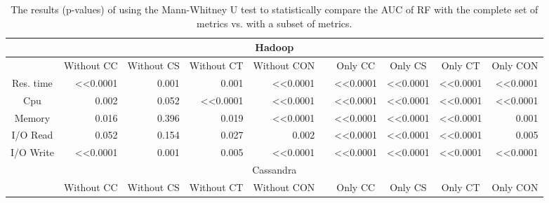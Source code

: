 \begin{table*}
\centering
\caption{The results (p-values) of using the Mann-Whitney U test to statistically compare the AUC of RF with the complete set of metrics vs. with a subset of metrics. }
    \begin{tabular}{|c|r|r|r|r|r|r|r|r|r|}
    \hline
    \multicolumn{10}{|c|}{Hadoop}   \\ \hline
              & \multicolumn{1}{c|}{Without   CC} & \multicolumn{1}{c|}{Without   CS} & \multicolumn{1}{c|}{Without CT} & \multicolumn{1}{c|}{Without   CON} & \multicolumn{1}{c|}{} & \multicolumn{1}{c|}{Only CC}   & \multicolumn{1}{c|}{Only  CS} & \multicolumn{1}{c|}{Only  CT} & \multicolumn{1}{c|}{Only  CON} \\ \cline{1-5} \cline{7-10} 
    Res. time & \textless{}\textless{}0.0001      & 0.001    & 0.001  & \textless{}\textless{}0.0001       &                       & \textless{}\textless{}0.0001   & \textless{}\textless{}0.0001  & \textless{}\textless{}0.0001  & \textless{}\textless{}0.0001   \\ \cline{1-5} \cline{7-10} 
    Cpu       & 0.002    & 0.052    & \textless{}\textless{}0.0001    & \textless{}\textless{}0.0001       &                       & \textless{}\textless{}0.0001   & \textless{}\textless{}0.0001  & \textless{}\textless{}0.0001  & \textless{}\textless{}0.0001   \\ \cline{1-5} \cline{7-10} 
    Memory    & 0.016    & 0.396    & 0.019  & \textless{}\textless{}0.0001       &                       & \textless{}\textless{}0.0001   & \textless{}\textless{}0.0001  & \textless{}\textless{}0.0001  & 0.001 \\ \cline{1-5} \cline{7-10} 
    I/O Read  & 0.052    & 0.154    & 0.027  & 0.002     &                       & \textless{}\textless{}0.0001   & \textless{}\textless{}0.0001  & \textless{}\textless{}0.0001  & 0.005 \\ \cline{1-5} \cline{7-10} 
    I/O Write & \textless{}\textless{}0.0001      & 0.001    & 0.005  & \textless{}\textless{}0.0001       &                       & \textless{}\textless{}0.0001   & \textless{}\textless{}0.0001  & \textless{}\textless{}0.0001  & \textless{}\textless{}0.0001   \\ \hline
    \multicolumn{10}{|c|}{Cassandra}\\ \hline
              & \multicolumn{1}{c|}{Without   CC} & \multicolumn{1}{c|}{Without   CS} & \multicolumn{1}{c|}{Without CT} & \multicolumn{1}{c|}{Without   CON} & \multicolumn{1}{c|}{} & \multicolumn{1}{c|}{Only   CC} & \multicolumn{1}{c|}{Only  CS} & \multicolumn{1}{c|}{Only  CT} & \multicolumn{1}{c|}{Only  CON} \\ \cline{1-5} \cline{7-10} 

\end{tabular}
\end{table*}
